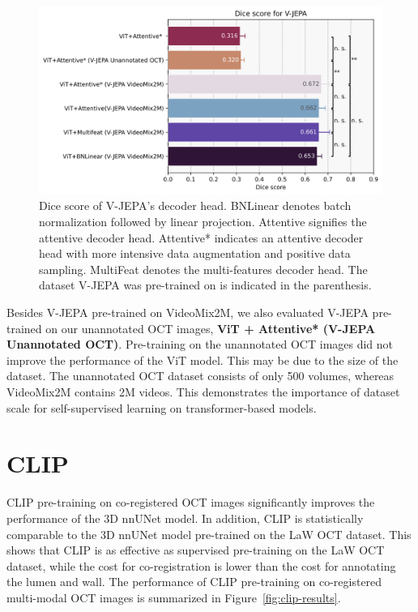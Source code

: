 \documentclass[a4paper,11pt,oneside]{report}
\begin{document}
\begin{figure}[hbt]
    \centering
    \includegraphics[width=0.75\linewidth]{figures/result_VJEPA_results.png}
    \caption{Dice score of V-JEPA's decoder head. BNLinear denotes batch normalization followed by linear projection. Attentive signifies the attentive decoder head. Attentive* indicates an attentive decoder head with more intensive data augmentation and positive data sampling. MultiFeat denotes the multi-features decoder head. The dataset V-JEPA was pre-trained on is indicated in the parenthesis.}
    \label{fig:vjepa-decoder-results}
\end{figure}

Besides V-JEPA pre-trained on VideoMix2M, we also evaluated V-JEPA pre-trained on our unannotated OCT images, \textbf{ViT + Attentive* (V-JEPA Unannotated OCT)}. Pre-training on the unannotated OCT images did not improve the performance of the ViT model. This may be due to the size of the dataset. The unannotated OCT dataset consists of only 500 volumes, whereas VideoMix2M contains 2M videos. This demonstrates the importance of dataset scale for self-supervised learning on transformer-based models.

\section{CLIP}
CLIP pre-training on co-registered OCT images significantly improves the performance of the 3D nnUNet model. In addition, CLIP is statistically comparable to the 3D nnUNet model pre-trained on the LaW OCT dataset. This shows that CLIP is as effective as supervised pre-training on the LaW OCT dataset, while the cost for co-registration is lower than the cost for annotating the lumen and wall. The performance of CLIP pre-training on co-registered multi-modal OCT images is summarized in Figure~\ref{fig:clip-results}.
\end{document}
